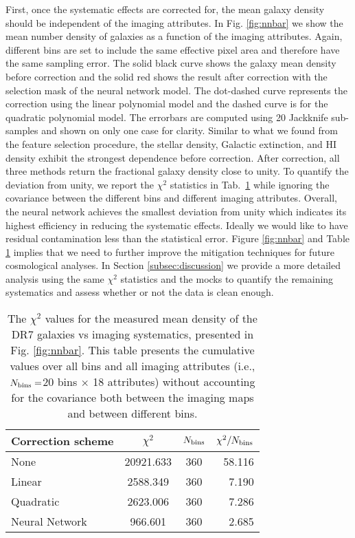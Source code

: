 First, once the systematic effects are corrected for, the mean galaxy density should be independent of the imaging attributes. In Fig. \ref{fig:nnbar} we show the mean number density of galaxies as a function of the imaging attributes. Again, different bins are set to include the same effective pixel area and therefore have the same sampling error. The solid black curve shows the galaxy mean density before correction and the solid red shows the result after correction with the selection mask of the neural network model. The dot-dashed curve represents the correction using the linear polynomial model and the dashed curve is for the quadratic polynomial model. The errorbars are computed using 20 Jackknife sub-samples and shown on only one case for clarity. Similar to what we found from the feature selection procedure, the stellar density, Galactic extinction, and HI density exhibit the strongest dependence before correction. After correction, all three methods return the fractional galaxy density close to unity. To quantify the deviation from unity, we report the $\chi^{2}$ statistics in Tab.~\ref{tab:chi2} while ignoring the covariance between the different bins and different imaging attributes. Overall, the neural network achieves the smallest deviation from unity which indicates its highest efficiency in reducing the systematic effects. Ideally we would like to have residual contamination less than the statistical error. Figure \ref{fig:nnbar} and Table \ref{tab:chi2} implies that we need to further improve the mitigation techniques for future cosmological analyses. In Section \ref{subsec:discussion} we provide a more detailed analysis using the same $\chi^{2}$ statistics and the mocks to quantify the remaining systematics and assess whether or not the data is clean enough.\\

\begin{table}
    \centering
    \caption[Caption]{The $\chi^{2}$ values for the measured mean density of the DR7 galaxies vs imaging systematics, presented in Fig. \ref{fig:nnbar}. This table presents the cumulative values over all bins and all imaging attributes (i.e., $N_{\rm bins}=$20 bins $\times$ 18 attributes) without accounting for the covariance both between the imaging maps and between different bins\protect\footnotemark.}
    \label{tab:chi2}
    \begin{tabular}{lccr} %
        \hline
        Correction scheme & $\chi^{2}$ & $N_{\rm bins}$ & $\chi^{2}/N_{\rm bins}$ \\
        \hline
        None & 20921.633 & 360 & 58.116\\
        Linear & 2588.349 & 360 & 7.190\\
        Quadratic & 2623.006 & 360 & 7.286 \\
        Neural Network & 966.601 & 360 & 2.685\\
    \end{tabular}
\end{table}

